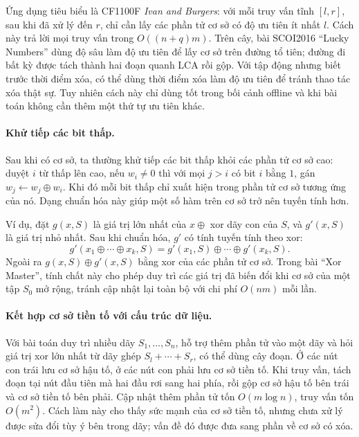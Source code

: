 \documentclass[11pt]{article}
\begin{document}
Ứng dụng tiêu biểu là CF1100F \emph{Ivan and Burgers}: với mỗi truy vấn tĩnh
\([l,r]\), sau khi đã xử lý đến \(r\), chỉ cần lấy các phần tử cơ sở có độ ưu
tiên ít nhất \(l\). Cách này trả lời mọi truy vấn trong \(O((n+q)m)\). Trên
cây, bài SCOI2016 ``Lucky Numbers'' dùng độ sâu làm độ ưu tiên để lấy cơ sở
trên đường tổ tiên; đường đi bất kỳ được tách thành hai đoạn quanh LCA rồi gộp.
Với tập động nhưng biết trước thời điểm xóa, có thể dùng thời điểm xóa làm độ
ưu tiên để tránh thao tác xóa thật sự. Tuy nhiên cách này chỉ dùng tốt trong
bối cảnh offline và khi bài toán không cần thêm một thứ tự ưu tiên khác.

\paragraph{Khử tiếp các bit thấp.}
Sau khi có cơ sở, ta thường khử tiếp các bit thấp khỏi các phần tử cơ sở cao:
duyệt \(i\) từ thấp lên cao, nếu \(w_i\ne0\) thì với mọi \(j>i\) có bit \(i\)
bằng \(1\), gán \(w_j\leftarrow w_j\oplus w_i\). Khi đó mỗi bit thấp chỉ xuất
hiện trong phần tử cơ sở tương ứng của nó. Dạng chuẩn hóa này giúp một số hàm
trên cơ sở trở nên tuyến tính hơn.

Ví dụ, đặt \(g(x,S)\) là giá trị lớn nhất của \(x\oplus\) xor dãy con của
\(S\), và \(g'(x,S)\) là giá trị nhỏ nhất. Sau khi chuẩn hóa, \(g'\) có tính
tuyến tính theo xor:
\[
  g'(x_1\oplus\cdots\oplus x_k,S)
  =g'(x_1,S)\oplus\cdots\oplus g'(x_k,S).
\]
Ngoài ra \(g(x,S)\oplus g'(x,S)\) bằng xor của các phần tử cơ sở. Trong bài
``Xor Master'', tính chất này cho phép duy trì các giá trị đã biến đổi khi cơ
sở của một tập \(S_0\) mở rộng, tránh cập nhật lại toàn bộ với chi phí
\(O(nm)\) mỗi lần.

\paragraph{Kết hợp cơ sở tiền tố với cấu trúc dữ liệu.}
Với bài toán duy trì nhiều dãy \(S_1,\ldots,S_n\), hỗ trợ thêm phần tử vào một
dãy và hỏi giá trị xor lớn nhất từ dãy ghép \(S_l+\cdots+S_r\), có thể dùng cây
đoạn. Ở các nút con trái lưu cơ sở hậu tố, ở các nút con phải lưu cơ sở tiền
tố. Khi truy vấn, tách đoạn tại nút đầu tiên mà hai đầu rơi sang hai phía, rồi
gộp cơ sở hậu tố bên trái và cơ sở tiền tố bên phải. Cập nhật thêm phần tử tốn
\(O(m\log n)\), truy vấn tốn \(O(m^2)\). Cách làm này cho thấy sức mạnh của cơ
sở tiền tố, nhưng chưa xử lý được sửa đổi tùy ý bên trong dãy; vấn đề đó được
đưa sang phần về cơ sở có xóa.
\end{document}
